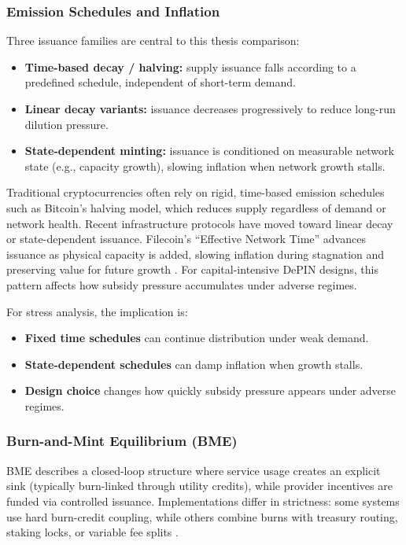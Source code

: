 \subsubsection{Emission Schedules and Inflation}
Three issuance families are central to this thesis comparison:
\begin{itemize}
    \item \textbf{Time-based decay / halving:} supply issuance falls according to a predefined schedule, independent of short-term demand.
    \item \textbf{Linear decay variants:} issuance decreases progressively to reduce long-run dilution pressure.
    \item \textbf{State-dependent minting:} issuance is conditioned on measurable network state (e.g., capacity growth), slowing inflation when network growth stalls.
\end{itemize}

Traditional cryptocurrencies often rely on rigid, time-based emission schedules such as Bitcoin's halving model, which reduces supply regardless of demand or network health. Recent infrastructure protocols have moved toward linear decay or state-dependent issuance. Filecoin's ``Effective Network Time'' advances issuance as physical capacity is added, slowing inflation during stagnation and preserving value for future growth \cite{Bernardineli2022}. For capital-intensive DePIN designs, this pattern affects how subsidy pressure accumulates under adverse regimes.

For stress analysis, the implication is:
\begin{itemize}
    \item \textbf{Fixed time schedules} can continue distribution under weak demand.
    \item \textbf{State-dependent schedules} can damp inflation when growth stalls.
    \item \textbf{Design choice} changes how quickly subsidy pressure appears under adverse regimes.
\end{itemize}

\subsubsection{Burn-and-Mint Equilibrium (BME)}
BME describes a closed-loop structure where service usage creates an explicit sink (typically burn-linked through utility credits), while provider incentives are funded via controlled issuance. Implementations differ in strictness: some systems use hard burn-credit coupling, while others combine burns with treasury routing, staking locks, or variable fee splits \cite{RenderBME, GeodnetIP7, CoinMarketCapHM}.

